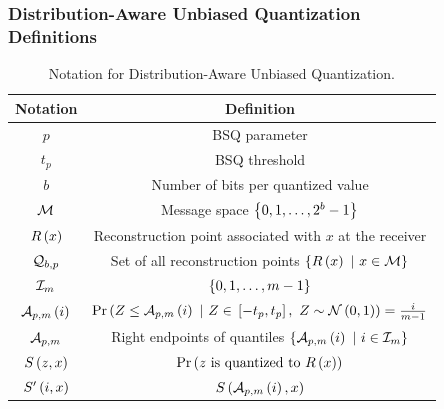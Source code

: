 \documentclass{beamer}
\begin{document}
    \begin{frame}
        \frametitle{Distribution-Aware Unbiased Quantization\\\small Definitions}
        \begin{table}[!ht]
            \centering
            \begin{tabular}{|c|c|}
                \hline
                \textbf{Notation} & \textbf{Definition} \\
                \hline
                \(p\) & BSQ parameter \\
                \hline
                \(t_p\) & BSQ threshold \\
                \hline
                \(b\) & Number of bits per quantized value \\
                \hline
                \(\mathcal M\) & Message space \(\left\{0,1,\ldots,2^b-1\right\}\) \\
                \hline
                \(R\left(x\right)\) & Reconstruction point associated with \(x\) at the receiver \\
                \hline
                \(\mathcal Q_{b,p}\) & Set of all reconstruction points \(\left\{R\left(x\right)\ |\ x \in \mathcal M\right\}\) \\
                \hline
                \(\mathcal I_m\) & \(\left\{0,1,\ldots,m-1\right\}\) \\
                \hline
                \(\mathcal A_{p,m}\left(i\right)\) & \(\Pr\left(Z \le \mathcal A_{p,m}\left(i\right)\ |\ Z \in {}\left[-t_p,t_p\right],\ Z \sim \mathcal N\left(0,1\right)\right) = \frac{i}{m-1}\) \\
                \hline
                \(\mathcal A_{p,m}\) & Right endpoints of quantiles \(\cbrak{\cA_{p,m}\brak{i}\ |\ i\in\cI_m}\) \\
                \hline
                \(S\left(z,x\right)\) & \(\Pr\left(z \text{ is quantized to } R\left(x\right)\right)\) \\
                \hline
                \(S^\prime\left(i,x\right)\) & \(S\left(\mathcal A_{p,m}\left(i\right), x\right)\) \\
                \hline
            \end{tabular}
            \caption{Notation for Distribution-Aware Unbiased Quantization.}
            \label{tab:dauq-defs}
        \end{table}
    \end{frame}
\end{document}
